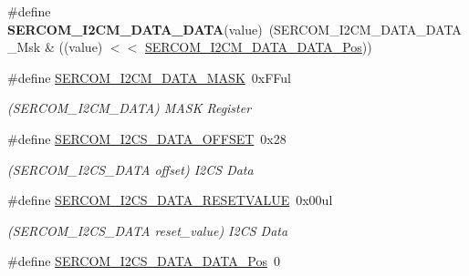 \begin{DoxyCompactItemize}
\item 
\hypertarget{group___s_a_m_l21___s_e_r_c_o_m_gab0d783170ee4fd96243093236096d1f2}{}\#define {\bfseries S\+E\+R\+C\+O\+M\+\_\+\+I2\+C\+M\+\_\+\+D\+A\+T\+A\+\_\+\+D\+A\+T\+A}(value)~(S\+E\+R\+C\+O\+M\+\_\+\+I2\+C\+M\+\_\+\+D\+A\+T\+A\+\_\+\+D\+A\+T\+A\+\_\+\+Msk \& ((value) $<$$<$ \hyperlink{group___s_a_m_l21___s_e_r_c_o_m_ga5d492a7a17f6ef63c189c8fd0703bee4}{S\+E\+R\+C\+O\+M\+\_\+\+I2\+C\+M\+\_\+\+D\+A\+T\+A\+\_\+\+D\+A\+T\+A\+\_\+\+Pos}))\label{group___s_a_m_l21___s_e_r_c_o_m_gab0d783170ee4fd96243093236096d1f2}

\item 
\hypertarget{group___s_a_m_l21___s_e_r_c_o_m_ga1b14f82c6aa82236cf7e5a23568e5cec}{}\#define \hyperlink{group___s_a_m_l21___s_e_r_c_o_m_ga1b14f82c6aa82236cf7e5a23568e5cec}{S\+E\+R\+C\+O\+M\+\_\+\+I2\+C\+M\+\_\+\+D\+A\+T\+A\+\_\+\+M\+A\+S\+K}~0x\+F\+Ful\label{group___s_a_m_l21___s_e_r_c_o_m_ga1b14f82c6aa82236cf7e5a23568e5cec}

\begin{DoxyCompactList}\small\item\em (S\+E\+R\+C\+O\+M\+\_\+\+I2\+C\+M\+\_\+\+D\+A\+T\+A) M\+A\+S\+K Register \end{DoxyCompactList}\item 
\hypertarget{group___s_a_m_l21___s_e_r_c_o_m_gabd04fb358adbdac19719136b912c6561}{}\#define \hyperlink{group___s_a_m_l21___s_e_r_c_o_m_gabd04fb358adbdac19719136b912c6561}{S\+E\+R\+C\+O\+M\+\_\+\+I2\+C\+S\+\_\+\+D\+A\+T\+A\+\_\+\+O\+F\+F\+S\+E\+T}~0x28\label{group___s_a_m_l21___s_e_r_c_o_m_gabd04fb358adbdac19719136b912c6561}

\begin{DoxyCompactList}\small\item\em (S\+E\+R\+C\+O\+M\+\_\+\+I2\+C\+S\+\_\+\+D\+A\+T\+A offset) I2\+C\+S Data \end{DoxyCompactList}\item 
\hypertarget{group___s_a_m_l21___s_e_r_c_o_m_ga667ef55882b091a9aa4e0bff1dae0fd9}{}\#define \hyperlink{group___s_a_m_l21___s_e_r_c_o_m_ga667ef55882b091a9aa4e0bff1dae0fd9}{S\+E\+R\+C\+O\+M\+\_\+\+I2\+C\+S\+\_\+\+D\+A\+T\+A\+\_\+\+R\+E\+S\+E\+T\+V\+A\+L\+U\+E}~0x00ul\label{group___s_a_m_l21___s_e_r_c_o_m_ga667ef55882b091a9aa4e0bff1dae0fd9}

\begin{DoxyCompactList}\small\item\em (S\+E\+R\+C\+O\+M\+\_\+\+I2\+C\+S\+\_\+\+D\+A\+T\+A reset\+\_\+value) I2\+C\+S Data \end{DoxyCompactList}\item 
\hypertarget{group___s_a_m_l21___s_e_r_c_o_m_ga12ba9b88b0fe76770dd6a570d48e1f8b}{}\#define \hyperlink{group___s_a_m_l21___s_e_r_c_o_m_ga12ba9b88b0fe76770dd6a570d48e1f8b}{S\+E\+R\+C\+O\+M\+\_\+\+I2\+C\+S\+\_\+\+D\+A\+T\+A\+\_\+\+D\+A\+T\+A\+\_\+\+Pos}~0\label{group___s_a_m_l21___s_e_r_c_o_m_ga12ba9b88b0fe76770dd6a570d48e1f8b}


\end{DoxyCompactItemize}
